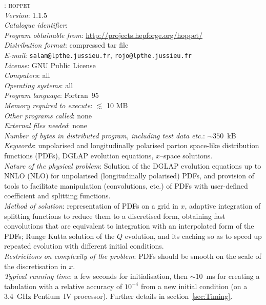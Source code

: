 \documentclass[12pt]{article}
\newcommand{\hoppet}{\textsc{hoppet}\xspace}
\begin{document}
: \hoppet \\[2mm]
{\em Version\/}: 1.1.5%
\\[2mm]
{\em Catalogue identifier\/}: \\[2mm]
{\em Program obtainable from\/}:
\url{http://projects.hepforge.org/hoppet/}
\\[2mm]
{\em Distribution format\/}: compressed tar file \\[2mm]
{\em E-mail\/}: {\tt salam@lpthe.jussieu.fr}, 
{\tt rojo@lpthe.jussieu.fr} \\[2mm]
{\em License\/}: GNU Public License \\[2mm]
{\em Computers\/}: all \\[2mm]
{\em Operating systems\/}: all \\[2mm]
{\em Program language\/}: Fortran~95 \\[2mm]
{\em Memory required to execute\/}:  $\lesssim$ 10 MB \\[2mm]
{\em Other programs called\/}: none \\[2mm]
{\em External files needed\/}: none \\[2mm]
{\em Number of bytes in distributed program, including test data
  etc.\/}: $\sim 350$~kB\\[2mm]
{\em Keywords\/}: unpolarised and longitudinally polarised parton
space-like distribution functions (PDFs), DGLAP evolution equations,
$x$--space solutions.
\\[2mm]
{\em Nature of the physical problem\/}: Solution of the DGLAP
evolution equations up to NNLO (NLO) for unpolarised (longitudinally
polarised) PDFs, and provision of tools to facilitate manipulation
(convolutions, etc.) of PDFs with user-defined coefficient and
splitting functions.
\\[2mm]
%
{\em Method of solution\/}:
representation of PDFs on a grid in $x$, adaptive integration of
splitting functions to reduce them to a discretised
form, obtaining fast
convolutions that are equivalent to integration with an interpolated
form of the PDFs; Runge Kutta solution of the $Q$ evolution, and
its caching so as to speed up repeated evolution with different
initial conditions.
\\[2mm]
{\em Restrictions on complexity of the problem\/}: PDFs should be
smooth on the scale of the discretisation in $x$.
\\[2mm]
{\em Typical running time\/}: a few seconds for initialisation, then
$\sim 10$~ms for creating a tabulation with a relative accuracy of
$10^{-4}$ from a new initial condition (on a 3.4~GHz Pentium~IV
processor). Further details in section~\ref{sec:Timing}.
\end{document}
